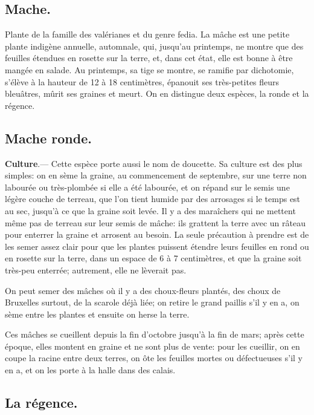 \documentclass[10pt,a4paper]{book}
\begin{document}
\subsection{Mache.}

Plante de la famille des valérianes et du genre fedia. La mâche est une petite plante indigène annuelle, automnale, qui, jusqu'au printemps, ne montre que des feuilles étendues en rosette sur la terre, et, dans cet état, elle est bonne à être mangée en salade. Au printemps, sa tige se montre, se ramifie par dichotomie, s'élève à la hauteur de 12 à 18 centimètres, épanouit ses très-petites fleurs bleuâtres, mûrit ses graines et meurt. On en distingue deux espèces, la ronde et la régence.

\subsection{Mache ronde.}

\textbf{Culture}.--- Cette espèce porte aussi le nom de doucette. Sa culture est des plus simples: on en sème la graine, au commencement de septembre, sur une terre non labourée ou très-plombée si elle a été labourée, et on répand sur le semis une légère couche de terreau, que l'on tient humide par des arrosages si le temps est au sec, jusqu'à ce que la graine soit levée. Il y a des maraîchers qui ne mettent même pas de terreau sur leur semis de mâche: ils grattent la terre avec un râteau pour enterrer la graine et arrosent au besoin. La seule précaution à prendre est de les semer assez clair pour que les plantes puissent étendre leurs feuilles en rond ou en rosette sur la terre, dans un espace de 6 à 7 centimètres, et que la graine soit très-peu enterrée; autrement, elle ne lèverait pas.

On peut semer des mâches où il y a des choux-fleurs plantés, des choux de Bruxelles surtout, de la scarole déjà liée; on retire le grand paillis s'il y en a, on sème entre les plantes et ensuite on herse la terre.

Ces mâches se cueillent depuis la fin d'octobre jusqu'à la fin de mars; après cette époque, elles montent en graine et ne sont plus de vente: pour les cueillir, on en coupe la racine entre deux terres, on ôte les feuilles mortes ou défectueuses s'il y en a, et on les porte à la halle dans des calais.

\subsection{La régence.}
\end{document}
